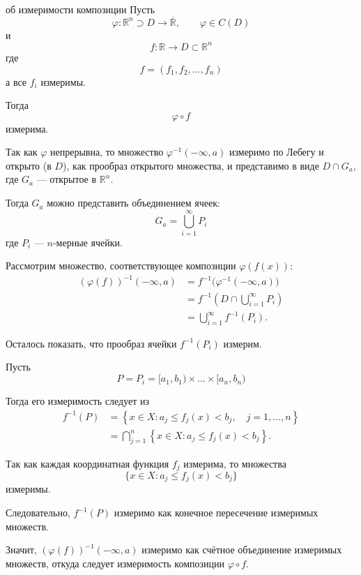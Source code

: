 \documentclass[12pt,a4paper]{article}
\begin{document}
\begin{theorem}{об измеримости композиции}
    Пусть
    \[
        \varphi:\mathbb{R}^n\supset D\to\overline{\mathbb{R}},
        \qquad
        \varphi\in C(D)
    \]
    и
    \[
        f:\mathbb{R}\to D\subset\mathbb{R}^n
    \]
    где
    \[
        f=(f_1,f_2,\ldots,f_n)
    \]
    а все $f_i$ измеримы.

    Тогда
    \[
        \varphi\circ f
    \]
    измерима.
\end{theorem}

\begin{proofbox}{}
    Так как $\varphi$ непрерывна, то множество
    $\varphi^{-1}(-\infty,a)$ измеримо по Лебегу и открыто
    (в $D$), как прообраз открытого множества, и представимо
    в виде $D\cap G_a$, где $G_a$ --- открытое в $\mathbb{R}^n$.

    Тогда $G_a$ можно представить объединением ячеек:
    \[
        G_a=\bigcup_{i=1}^{\infty}P_i
    \]
    где $P_i$ --- $n$-мерные ячейки.

    Рассмотрим множество, соответствующее композиции
    $\varphi(f(x))$:
    \[
        \begin{aligned}
            (\varphi(f))^{-1}(-\infty,a)
            &=f^{-1}\bigl(\varphi^{-1}(-\infty,a)\bigr)\\
            &=f^{-1}\left(D\cap\bigcup_{i=1}^{\infty}P_i\right)\\
            &=\bigcup_{i=1}^{\infty}f^{-1}(P_i).
        \end{aligned}
    \]

    Осталось показать, что прообраз ячейки $f^{-1}(P_i)$
    измерим.

    Пусть
    \[
        P=P_i=[a_1,b_1)\times\ldots\times[a_n,b_n)
    \]

    Тогда его измеримость следует из
    \[
        \begin{aligned}
            f^{-1}(P)
            &=\left\{
            x\in X:
            a_j\leqslant f_j(x)<b_j,\quad
            j=1,\ldots,n
            \right\}\\
            &=\bigcap_{j=1}^{n}
            \left\{
            x\in X:
            a_j\leqslant f_j(x)<b_j
            \right\}.
        \end{aligned}
    \]

    Так как каждая координатная функция $f_j$ измерима,
    то множества
    \[
        \{x\in X:a_j\leqslant f_j(x)<b_j\}
    \]
    измеримы.

    Следовательно, $f^{-1}(P)$ измеримо как конечное
    пересечение измеримых множеств.

    Значит, $(\varphi(f))^{-1}(-\infty,a)$ измеримо как
    счётное объединение измеримых множеств, откуда
    следует измеримость композиции $\varphi\circ f$.
\end{proofbox}
\end{document}
